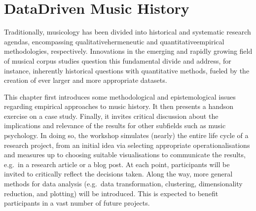 \documentclass[letterpaper,10pt,english]{sphinxmanual}
\begin{document}
\chapter{Data\sphinxhyphen{}Driven Music History}
\label{\detokenize{data-driven_music_history:data-driven-music-history}}\label{\detokenize{data-driven_music_history::doc}}
Traditionally, musicology has been divided into historical and
systematic research agendas, encompassing qualitative\sphinxhyphen{}hermeneutic and
quantitative\sphinxhyphen{}empirical methodologies, respectively. Innovations in the
emerging and rapidly growing field of musical corpus studies question
this fundamental divide and address, for instance, inherently historical
questions with quantitative methods, fueled by the creation of ever
larger and more appropriate datasets.

This chapter first introduces some methodological and epistemological
issues regarding empirical approaches to music history. It then presents
a hands\sphinxhyphen{}on exercise on a case study. Finally, it invites critical
discussion about the implications and relevance of the results for other
subfields such as music psychology. In doing so, the workshop simulates
(nearly) the entire life cycle of a research project, from an initial
idea via selecting appropriate operationalisations and measures up to
choosing suitable visualisations to communicate the results, e.g. in a
research article or a blog post. At each point, participants will be
invited to critically reflect the decisions taken. Along the way, more
general methods for data analysis (e.g. data transformation, clustering,
dimensionality reduction, and plotting) will be introduced. This is
expected to benefit participants in a vast number of future projects.

\begin{sphinxVerbatim}[commandchars=\\\{\}]
    
 
    
 
    
   
\end{sphinxVerbatim}
\end{document}
